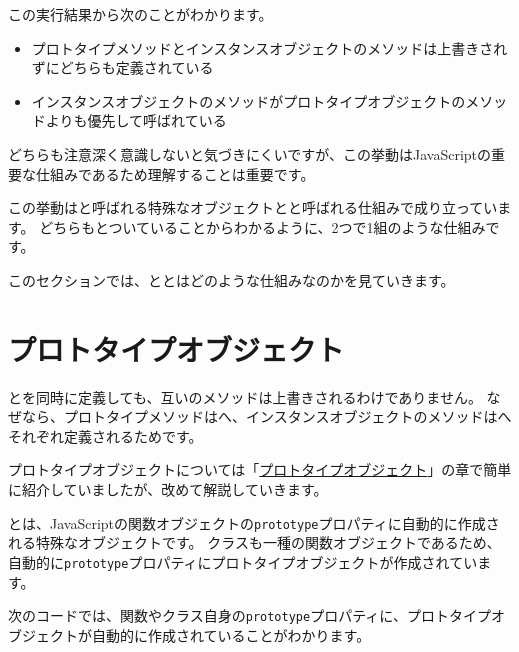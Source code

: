 この実行結果から次のことがわかります。

\begin{itemize}
\item
  プロトタイプメソッドとインスタンスオブジェクトのメソッドは上書きされずにどちらも定義されている
\item
  インスタンスオブジェクトのメソッドがプロトタイプオブジェクトのメソッドよりも優先して呼ばれている
\end{itemize}

どちらも注意深く意識しないと気づきにくいですが、この挙動はJavaScriptの重要な仕組みであるため理解することは重要です。

この挙動は\textbf{}と呼ばれる特殊なオブジェクトと\textbf{}と呼ばれる仕組みで成り立っています。
どちらも\textbf{}とついていることからわかるように、2つで1組のような仕組みです。

このセクションでは、\textbf{}と\textbf{}とはどのような仕組みなのかを見ていきます。

\hypertarget{prototype}{%
\section{プロトタイプオブジェクト}\label{prototype}}

\textbf{}と\textbf{}を同時に定義しても、互いのメソッドは上書きされるわけでありません。
なぜなら、プロトタイプメソッドは\textbf{}へ、インスタンスオブジェクトのメソッドは\textbf{}へそれぞれ定義されるためです。

プロトタイプオブジェクトについては「\hyperlink{prototype-object}{プロトタイプオブジェクト}」の章で簡単に紹介していましたが、改めて解説していきます。

\textbf{}とは、JavaScriptの関数オブジェクトの\texttt{prototype}プロパティに自動的に作成される特殊なオブジェクトです。
クラスも一種の関数オブジェクトであるため、自動的に\texttt{prototype}プロパティにプロトタイプオブジェクトが作成されています。

次のコードでは、関数やクラス自身の\texttt{prototype}プロパティに、プロトタイプオブジェクトが自動的に作成されていることがわかります。

